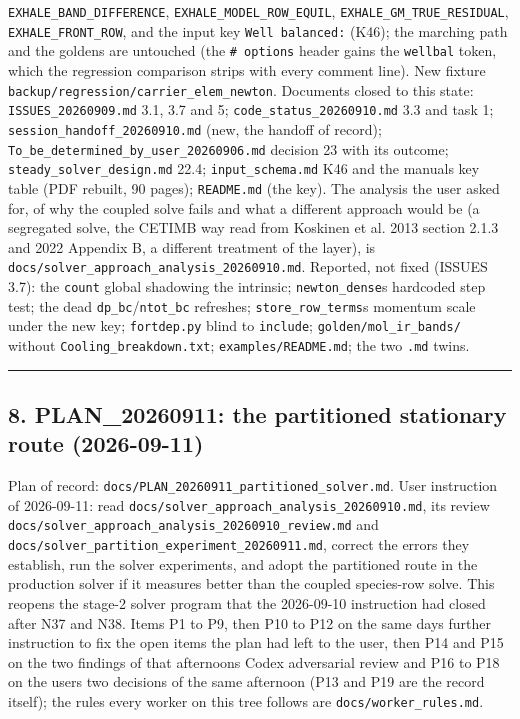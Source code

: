 \documentclass[english,a4paper]{my_memo}
\begin{document}
\begin{itemize}
  \texttt{EXHALE\_BAND\_DIFFERENCE}, \texttt{EXHALE\_MODEL\_ROW\_EQUIL},
  \texttt{EXHALE\_GM\_TRUE\_RESIDUAL}, \texttt{EXHALE\_FRONT\_ROW}, and the input key
  \texttt{Well\ balanced:} (K46); the marching path and the goldens are untouched
  (the \texttt{\#\ options} header gains the \texttt{wellbal} token, which the regression
  comparison strips with every comment line). New fixture
  \texttt{backup/regression/carrier\_elem\_newton}. Documents closed to this state:
  \texttt{ISSUES\_20260909.md} 3.1, 3.7 and 5; \texttt{code\_status\_20260910.md} 3.3 and
  task 1; \texttt{session\_handoff\_20260910.md} (new, the handoff of record);
  \texttt{To\_be\_determined\_by\_user\_20260906.md} decision 23 with its outcome;
  \texttt{steady\_solver\_design.md} 22.4; \texttt{input\_schema.md} K46 and the manual\textquotesingle s
  key table (PDF rebuilt, 90 pages); \texttt{README.md} (the key). The analysis
  the user asked for, of why the coupled solve fails and what a different
  approach would be (a segregated solve, the CETIMB way read from
  Koskinen et al. 2013 section 2.1.3 and 2022 Appendix B, a different
  treatment of the layer), is \texttt{docs/solver\_approach\_analysis\_20260910.md}.
  Reported, not fixed (ISSUES 3.7): the \texttt{count} global shadowing the
  intrinsic; \texttt{newton\_dense}\textquotesingle s hardcoded step test; the dead \texttt{dp\_bc}/\texttt{ntot\_bc}
  refreshes; \texttt{store\_row\_terms}\textquotesingle s momentum scale under the new key;
  \texttt{fortdep.py} blind to \texttt{include}; \texttt{golden/mol\_ir\_bands/} without
  \texttt{Cooling\_breakdown.txt}; \texttt{examples/README.md}; the two \texttt{.md} twins.
\end{itemize}

\begin{center}\rule{0.5\linewidth}{0.5pt}\end{center}

\subsection{8. PLAN\_20260911: the partitioned stationary route (2026-09-11)}\label{8-plan_20260911-the-partitioned-stationary-route-2026-09-11}

Plan of record: \texttt{docs/PLAN\_20260911\_partitioned\_solver.md}. User instruction
of 2026-09-11: read \texttt{docs/solver\_approach\_analysis\_20260910.md}, its review
\texttt{docs/solver\_approach\_analysis\_20260910\_review.md} and
\texttt{docs/solver\_partition\_experiment\_20260911.md}, correct the errors they
establish, run the solver experiments, and adopt the partitioned route in the
production solver if it measures better than the coupled species-row solve.
This reopens the stage-2 solver program that the 2026-09-10 instruction had
closed after N37 and N38. Items P1 to P9, then P10 to P12 on the same day\textquotesingle s
further instruction to fix the open items the plan had left to the user, then
P14 and P15 on the two findings of that afternoon\textquotesingle s Codex adversarial review
and P16 to P18 on the user\textquotesingle s two decisions of the same afternoon (P13 and P19
are the record itself); the rules every worker on this tree follows are
\texttt{docs/worker\_rules.md}.
\end{document}
